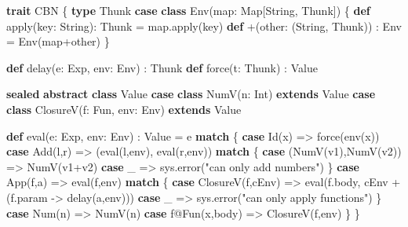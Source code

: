 \documentclass[]{article}
\newenvironment{Shaded}{}{}
\newcommand{\FunctionTok}[1]{\textcolor[rgb]{0.02,0.16,0.49}{#1}}
\newcommand{\KeywordTok}[1]{\textcolor[rgb]{0.00,0.44,0.13}{\textbf{#1}}}
\newcommand{\NormalTok}[1]{#1}
\newcommand{\StringTok}[1]{\textcolor[rgb]{0.25,0.44,0.63}{#1}}
\begin{document}
\begin{Shaded}
\begin{Highlighting}[]
\KeywordTok{trait}\NormalTok{ CBN \{}
  \KeywordTok{type}\NormalTok{ Thunk}
  \KeywordTok{case} \KeywordTok{class} \FunctionTok{Env}\NormalTok{(map: Map[String, Thunk]) \{}
    \KeywordTok{def} \FunctionTok{apply}\NormalTok{(key: String): Thunk = map.}\FunctionTok{apply}\NormalTok{(key)}
    \KeywordTok{def}\NormalTok{ +(other: (String, Thunk)) : Env = }\FunctionTok{Env}\NormalTok{(map+other)}
\NormalTok{  \}}

  \KeywordTok{def} \FunctionTok{delay}\NormalTok{(e: Exp, env: Env) : Thunk}
  \KeywordTok{def} \FunctionTok{force}\NormalTok{(t: Thunk) : Value}

  \KeywordTok{sealed} \KeywordTok{abstract} \KeywordTok{class}\NormalTok{ Value}
  \KeywordTok{case} \KeywordTok{class} \FunctionTok{NumV}\NormalTok{(n: Int) }\KeywordTok{extends}\NormalTok{ Value}
  \KeywordTok{case} \KeywordTok{class} \FunctionTok{ClosureV}\NormalTok{(f: Fun, env: Env) }\KeywordTok{extends}\NormalTok{ Value}
  
  \KeywordTok{def} \FunctionTok{eval}\NormalTok{(e: Exp, env: Env) : Value = e }\KeywordTok{match}\NormalTok{ \{}
    \KeywordTok{case} \FunctionTok{Id}\NormalTok{(x) =\textgreater{} }\FunctionTok{force}\NormalTok{(}\FunctionTok{env}\NormalTok{(x))}
    \KeywordTok{case} \FunctionTok{Add}\NormalTok{(l,r) =\textgreater{}}
\NormalTok{      (}\FunctionTok{eval}\NormalTok{(l,env), }\FunctionTok{eval}\NormalTok{(r,env)) }\KeywordTok{match}\NormalTok{ \{}
        \KeywordTok{case}\NormalTok{ (}\FunctionTok{NumV}\NormalTok{(v1),}\FunctionTok{NumV}\NormalTok{(v2)) =\textgreater{} }\FunctionTok{NumV}\NormalTok{(v1+v2)}
        \KeywordTok{case}\NormalTok{ \_ =\textgreater{} sys.}\FunctionTok{error}\NormalTok{(}\StringTok{"can only add numbers"}\NormalTok{)}
\NormalTok{      \}}
    \KeywordTok{case} \FunctionTok{App}\NormalTok{(f,a) =\textgreater{} }\FunctionTok{eval}\NormalTok{(f,env) }\KeywordTok{match}\NormalTok{ \{}
      \KeywordTok{case} \FunctionTok{ClosureV}\NormalTok{(f,cEnv) =\textgreater{} }\FunctionTok{eval}\NormalTok{(f.}\FunctionTok{body}\NormalTok{, cEnv + (f.}\FunctionTok{param}\NormalTok{ {-}\textgreater{} }\FunctionTok{delay}\NormalTok{(a,env)))}
      \KeywordTok{case}\NormalTok{ \_ =\textgreater{} sys.}\FunctionTok{error}\NormalTok{(}\StringTok{"can only apply functions"}\NormalTok{)}
\NormalTok{    \}}
    \KeywordTok{case} \FunctionTok{Num}\NormalTok{(n) =\textgreater{} }\FunctionTok{NumV}\NormalTok{(n)}
    \KeywordTok{case}\NormalTok{ f@}\FunctionTok{Fun}\NormalTok{(x,body) =\textgreater{} }\FunctionTok{ClosureV}\NormalTok{(f,env)}
\NormalTok{  \}}
\NormalTok{\}}
\end{Highlighting}
\end{Shaded}
\end{document}
